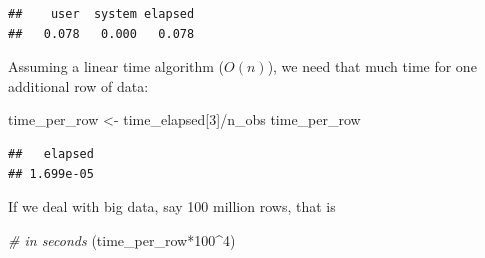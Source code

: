 \documentclass[
  12pt,
]{style/krantz}
\newenvironment{Shaded}{\begin{snugshade}}{\end{snugshade}}
\newcommand{\CommentTok}[1]{\textcolor[rgb]{0.56,0.35,0.01}{\textit{#1}}}
\newcommand{\ControlFlowTok}[1]{\textcolor[rgb]{0.13,0.29,0.53}{\textbf{#1}}}
\newcommand{\DecValTok}[1]{\textcolor[rgb]{0.00,0.00,0.81}{#1}}
\newcommand{\FloatTok}[1]{\textcolor[rgb]{0.00,0.00,0.81}{#1}}
\newcommand{\FunctionTok}[1]{\textcolor[rgb]{0.00,0.00,0.00}{#1}}
\newcommand{\NormalTok}[1]{#1}
\newcommand{\OtherTok}[1]{\textcolor[rgb]{0.56,0.35,0.01}{#1}}
\newcommand{\SpecialCharTok}[1]{\textcolor[rgb]{0.00,0.00,0.00}{#1}}
\begin{document}
\begin{Shaded}
\end{Shaded}

\begin{verbatim}
##    user  system elapsed 
##   0.078   0.000   0.078
\end{verbatim}

Assuming a linear time algorithm (\(O(n)\)), we need that much time for one additional row of data:

\begin{Shaded}
\begin{Highlighting}[]
\NormalTok{time\_per\_row }\OtherTok{\textless{}{-}}\NormalTok{ time\_elapsed[}\DecValTok{3}\NormalTok{]}\SpecialCharTok{/}\NormalTok{n\_obs}
\NormalTok{time\_per\_row}
\end{Highlighting}
\end{Shaded}

\begin{verbatim}
##   elapsed 
## 1.699e-05
\end{verbatim}

If we deal with big data, say 100 million rows, that is

\begin{Shaded}
\begin{Highlighting}[]
\CommentTok{\# in seconds}
\NormalTok{(time\_per\_row}\SpecialCharTok{*}\DecValTok{100}\SpecialCharTok{\^{}}\DecValTok{4}\NormalTok{) }
\end{Highlighting}
\end{Shaded}
\end{document}
